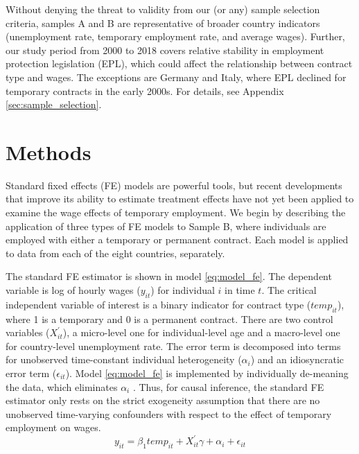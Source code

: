\documentclass[12pt]{article}
\begin{document}
Without denying the threat to validity from our (or any) sample selection criteria, samples A and B are representative of broader country indicators (unemployment rate, temporary employment rate, and average wages).  Further, our study period from 2000 to 2018 covers relative stability in employment protection legislation (EPL), which could affect the relationship between contract type and wages. The exceptions are Germany and Italy, where EPL declined for temporary contracts in the early 2000s. For details, see Appendix \ref{sec:sample_selection}.

\section{Methods}

Standard fixed effects (FE) models are powerful tools, but recent developments that improve its ability to estimate treatment effects have not yet been applied to examine the wage effects of temporary employment.  We begin by describing the application of three types of FE models to Sample B, where individuals are employed with either a temporary or permanent contract.  Each model is applied to data from each of the eight countries, separately. 

The standard FE estimator is shown in model \ref{eq:model_fe}.  The dependent variable is log of hourly wages ($y_{it}$) for individual $i$ in time $t$. The critical independent variable of interest is a binary indicator for contract type ($temp_{it}$), where 1 is a temporary and 0 is a permanent contract. There are two control variables ($X^\prime_{it}$), a micro-level one for individual-level age and a macro-level one for country-level unemployment rate. The error term is decomposed into terms for unobserved time-constant individual heterogeneity ($\alpha_i$) and an idiosyncratic error term ($\epsilon_{it}$).  Model \ref{eq:model_fe} is implemented by individually de-meaning the data, which eliminates $\alpha_i$ \citep{halaby_panel_2004}.  Thus, for causal inference, the standard FE estimator only rests on the strict exogeneity assumption that there are no unobserved time-varying confounders with respect to the effect of temporary employment on wages.
\begin{equation}
    y_{it} = \beta_1 temp_{it} + X^\prime_{it} \gamma + \alpha_i + \epsilon_{it}
    \label{eq:model_fe}
\end{equation}
\end{document}
